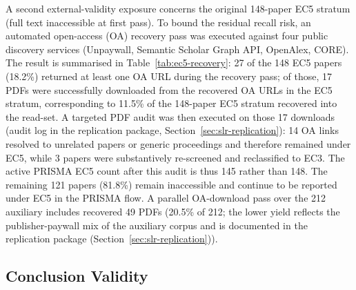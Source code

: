 





A second external-validity exposure concerns the original 148-paper EC5
stratum (full text inaccessible at first pass). To bound the residual recall
risk, an
automated open-access (OA) recovery pass was executed against four public
discovery services (Unpaywall, Semantic Scholar Graph API, OpenAlex, CORE).
The result is summarised in Table~\ref{tab:ec5-recovery}: 27 of the 148 EC5
papers (18.2\%) returned at least one OA URL during the recovery pass; of
those, 17 PDFs were successfully downloaded from the recovered OA URLs in
the EC5 stratum, corresponding to 11.5\% of the 148-paper EC5 stratum
recovered into the read-set. A targeted PDF audit was
then executed on those 17 downloads (audit log in the replication package,
Section~\ref{sec:slr-replication}): 14 OA
links resolved to unrelated papers or generic proceedings and therefore
remained under EC5, while 3 papers were substantively re-screened and
reclassified to EC3. The active PRISMA EC5 count after this audit is thus
145 rather than 148. The remaining 121
papers (81.8\%) remain inaccessible and continue to be reported under EC5
in the PRISMA flow. A parallel OA-download pass over the 212 auxiliary
includes recovered 49 PDFs (20.5\% of 212; the lower yield reflects the
publisher-paywall mix of the auxiliary corpus and is documented in the
replication package (Section~\ref{sec:slr-replication})).



\subsection{Conclusion Validity}

